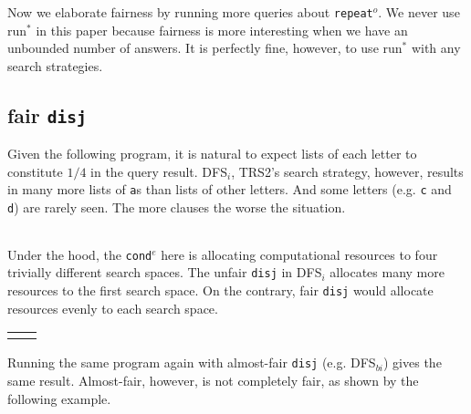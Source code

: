 \documentclass[format=acmlarge, review=true, authordraft=true]{acmart}
\newcommand{\conde}{\texttt{cond$^e$}}
\newcommand{\disj}{\texttt{disj}}
\newcommand{\repeato}{\texttt{repeat$^o$}}
\newcommand{\DFSi }[0]{DFS$_{i}$}
\newcommand{\DFSbi}[0]{DFS$_{bi}$}
\newcommand{\runstar}{run$^*$}
\begin{document}

Now we elaborate fairness by running more queries about \repeato{}. We never 
use \runstar{} in this paper because fairness is more interesting when we 
have an unbounded number of answers. It is perfectly fine, however, to use 
\runstar{} with any search strategies.

\subsection{fair \texttt{disj}}

Given the following program, it is natural to expect lists of each
letter to constitute $1/4$ in the query result. \DFSi, TRS2's search
strategy, however, results in many more lists of \texttt{a}s than
lists of other letters. And some letters (e.g. \texttt{c} and
\texttt{d}) are rarely seen. The more clauses the worse the situation.

\begin{center}
	\begin{tabular}{c}
		
	\end{tabular}
\end{center}

Under the hood, the \conde{} here is allocating computational resources to 
four trivially different search spaces. The unfair \disj{} in 
\DFSi{} allocates many more resources to the first search space. On the 
contrary, fair \disj{} would allocate resources evenly to each search space. 

\begin{center}
	\begin{tabular}{l|r}
		 &
		
	\end{tabular}
\end{center}

Running the same program again with almost-fair \disj {} (e.g. 
\DFSbi{}) gives the same result. Almost-fair, however, is not 
completely fair, as shown by the following example. 

\begin{center}
	\begin{tabular}{c}
		
	\end{tabular}
\end{center}
\end{document}
